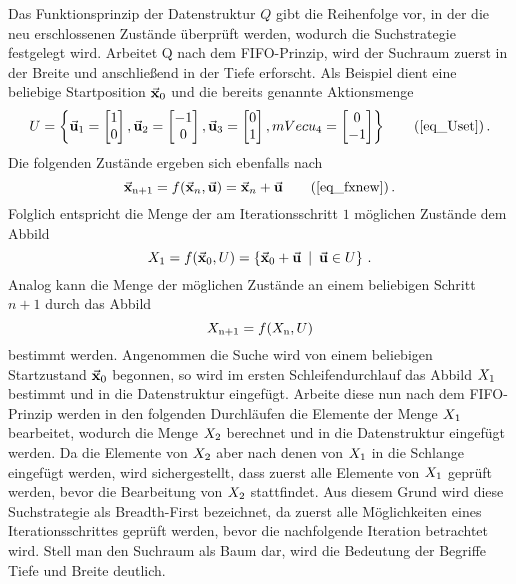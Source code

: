 Das Funktionsprinzip der Datenstruktur $Q$ gibt die Reihenfolge vor, in der die neu erschlossenen Zustände überprüft werden, wodurch die Suchstrategie festgelegt wird. Arbeitet Q nach dem FIFO-Prinzip, wird der Suchraum zuerst in der Breite und anschließend in der Tiefe erforscht. Als Beispiel dient eine beliebige Startposition $\vec{\mathbf{x}}_{\text{0}}$ und die bereits genannte Aktionsmenge
\begin{equation}
U = \left\{ 
\mVec{u}\idx{1} = \begin{bmatrix} 1 \\ 0 \end{bmatrix}, 
\mVec{u}\idx{2} = \begin{bmatrix} -1 \\ 0 \end{bmatrix},
\mVec{u}\idx{3} = \begin{bmatrix} 0 \\ 1 \end{bmatrix},
mVec{u}\idx{4} = \begin{bmatrix} 0 \\ -1\end{bmatrix} \right\}\tag{\ref{eq_Uset}}\,.
\end{equation}
Die folgenden Zustände ergeben sich ebenfalls nach
\begin{equation}
\mVec{x}\idx{n+1} = f(\mVec{x}_n, \mVec{u}) = \mVec{x}_n + \mVec{u}\tag{\ref{eq_fxnew}}\,.
\end{equation}
Folglich entspricht die Menge der am Iterationsschritt $1$ möglichen Zustände dem Abbild
\begin{equation}
X_{\text{1}} = f(\vec{\mathbf{x}}_{\text{0}}, U) = \left\{ \vec{\mathbf{x}}_{\text{0}}+\vec{\mathbf{u}} \hspace{5pt}\vert \hspace{5pt} \vec{\mathbf{u}} \in U \right\}\,.
\end{equation}
Analog kann die Menge der möglichen Zustände an einem beliebigen Schritt $n+1$ durch das Abbild
\begin{equation}
X_{\text{n+1}} = f(X_{\text{n}}, U)
\end{equation}
bestimmt werden.
Angenommen die Suche wird von einem beliebigen Startzustand $\vec{\mathbf{x}}_{\text{0}}$ begonnen, so wird im ersten Schleifendurchlauf das Abbild $X_{\text{1}}$ bestimmt und in die Datenstruktur eingefügt. Arbeite diese nun nach dem FIFO-Prinzip werden in den folgenden Durchläufen die Elemente der Menge $X_{\text{1}}$ bearbeitet, wodurch die Menge $X_{\text{2}}$ berechnet und in die Datenstruktur eingefügt werden. Da die Elemente von $X_{\text{2}}$ aber nach denen von $X_{\text{1}}$ in die Schlange eingefügt werden, wird sichergestellt, dass zuerst alle Elemente von $X_{\text{1}}$ geprüft werden, bevor die Bearbeitung von $X_{\text{2}}$ stattfindet. Aus diesem Grund wird diese Suchstrategie als Breadth-First bezeichnet, da zuerst alle Möglichkeiten eines Iterationsschrittes geprüft werden, bevor die nachfolgende Iteration betrachtet wird. Stell man den Suchraum als Baum dar, wird die Bedeutung der Begriffe Tiefe und Breite deutlich.


